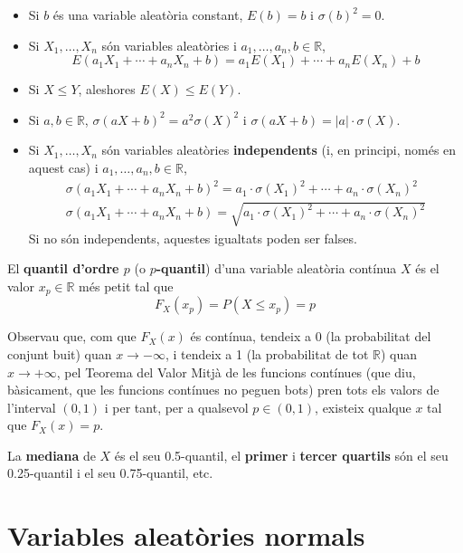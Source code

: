 \documentclass[
]{book}
\renewcommand{\leq}{\leqslant}
\newenvironment{rmdblock}[1]
  {
  \begin{itemize}
  \renewcommand{\labelitemi}{
    \raisebox{-.7\height}[0pt][0pt]{
      {\setkeys{Gin}{width=3em,keepaspectratio}\texttt{[image: Bioestadística-II\_files/figure-html/\#1]}}
    }
  }
  \setlength{\fboxsep}{1em}
  \begin{kframe}
  \item
  }
  {
  \end{kframe}
  \end{itemize}
  }
\newenvironment{rmdcorbes}
  {\begin{rmdblock}{corbes}}
  {\end{rmdblock}}
\theoremstyle{definition}
\theoremstyle{definition}
\theoremstyle{definition}
\theoremstyle{remark}
\begin{document}
\begin{itemize}
\item
  Si \(b\) és una variable aleatòria constant, \(E(b)=b\) i \(\sigma(b)^2=0\).
\item
  Si \(X_1,\ldots,X_n\) són variables aleatòries i \(a_1,\ldots,a_n,b\in \mathbb{R}\),
  \[
  E(a_1X_1+\cdots+a_nX_n+b)=a_1E(X_1)+\cdots+a_nE(X_n)+b
  \]
\item
  Si \(X\leq Y\), aleshores \(E(X)\leq E(Y)\).
\item
  Si \(a,b\in \mathbb{R}\), \(\sigma(aX+b)^2=a^2 \sigma(X)^2\) i \(\sigma(aX+b)=|a|\cdot \sigma(X)\).
\item
  Si \(X_1,\ldots,X_n\) són variables aleatòries \textbf{independents} (i, en principi, només en aquest cas) i \(a_1,\ldots,a_n,b\in \mathbb{R}\),
  \[
  \begin{array}{l}
  \sigma(a_1X_1+\cdots+a_nX_n+b)^2=a_1\cdot\sigma(X_1)^2+\cdots+a_n\cdot\sigma(X_n)^2\\
  \sigma(a_1X_1+\cdots+a_nX_n+b)=\sqrt{a_1\cdot\sigma(X_1)^2+\cdots+a_n\cdot\sigma(X_n)^2}
  \end{array}
  \]
  Si no són independents, aquestes igualtats poden ser falses.
\end{itemize}

El \textbf{quantil d'ordre \(p\)} (o \textbf{\(p\)-quantil}) d'una variable aleatòria contínua \(X\) és el valor \(x_p\in \mathbb{R}\) més petit tal que
\[
F_X(x_p)=P(X\leq x_p)=p
\]

\begin{rmdcorbes}
Observau que, com que \(F_X(x)\) és contínua, tendeix a 0 (la probabilitat del conjunt buit) quan \(x\to -\infty\), i tendeix a 1 (la probabilitat de tot \(\mathbb{R}\)) quan \(x\to +\infty\), pel Teorema del Valor Mitjà de les funcions contínues (que diu, bàsicament, que les funcions contínues no peguen bots) pren tots els valors de l'interval \((0,1)\) i per tant, per a qualsevol \(p\in (0,1)\), existeix qualque \(x\) tal que \(F_X(x)=p\).
\end{rmdcorbes}

La \textbf{mediana} de \(X\) és el seu 0.5-quantil, el \textbf{primer} i \textbf{tercer quartils} són el seu 0.25-quantil i el seu 0.75-quantil, etc.

\hypertarget{sec:normal}{%
\section{Variables aleatòries normals}\label{sec:normal}}
\end{document}
